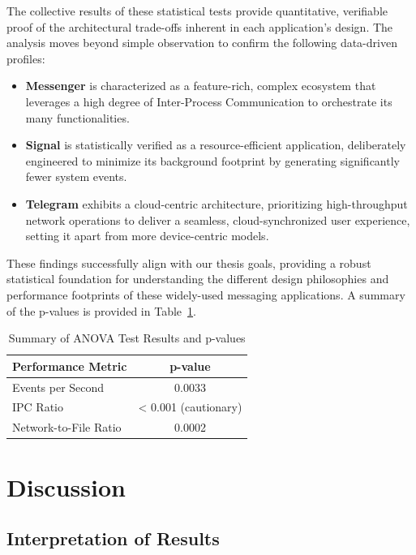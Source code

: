 \documentclass[a4paper,12pt]{report}
\begin{document}
The collective results of these statistical tests provide quantitative, verifiable proof of the architectural trade-offs inherent in each application's design. The analysis moves beyond simple observation to confirm the following data-driven profiles:
\begin{itemize}
    \item \textbf{Messenger} is characterized as a feature-rich, complex ecosystem that leverages a high degree of Inter-Process Communication to orchestrate its many functionalities.
    \item \textbf{Signal} is statistically verified as a resource-efficient application, deliberately engineered to minimize its background footprint by generating significantly fewer system events.
    \item \textbf{Telegram} exhibits a cloud-centric architecture, prioritizing high-throughput network operations to deliver a seamless, cloud-synchronized user experience, setting it apart from more device-centric models.
\end{itemize}
These findings successfully align with our thesis goals, providing a robust statistical foundation for understanding the different design philosophies and performance footprints of these widely-used messaging applications. A summary of the p-values is provided in Table~\ref{tab:comparative_tests_en}.

\begin{table}[H]
\centering
\caption{Summary of ANOVA Test Results and p-values}
\label{tab:comparative_tests_en}
\begin{tabular}{lc}
\toprule
\textbf{Performance Metric} & \textbf{p-value} \\
\midrule
Events per Second & 0.0033 \\
IPC Ratio & < 0.001 (cautionary) \\
Network-to-File Ratio & 0.0002 \\
\bottomrule
\end{tabular}
\end{table}


\chapter{Discussion}

\section{Interpretation of Results}
\end{document}
